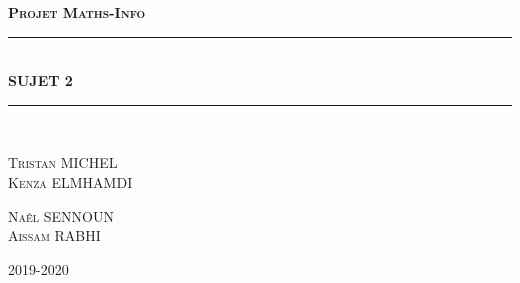 \documentclass{article}
\newcommand{\HRule}{\rule{\linewidth}{0.5mm}}
\begin{document}

\begin{titlepage}
    \begin{sffamily}
        \begin{center}
        
            \textsc{\bfseries \huge Projet Maths-Info }\\[1.5cm]
            \HRule \\[0.4cm]
            { \huge \bfseries SUJET 2\\[0.4cm] }
            \HRule \\[2cm]
        
            \begin{minipage}{0.4\textwidth}
                \begin{flushleft} \large
                    \textsc{Tristan MICHEL\\ Kenza ELMHAMDI}
                \end{flushleft}
            \end{minipage}
            \begin{minipage}{0.4\textwidth}
                \begin{flushright} \large
                    \textsc{Naêl SENNOUN\\Aissam RABHI}
                \end{flushright}
            \end{minipage}
            \vfill
        
            {\large 2019-2020}
            
        \end{center}
    \end{sffamily}
\end{titlepage}


\tableofcontents
\newpage
\end{document}
